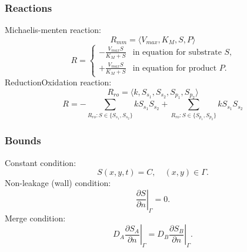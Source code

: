 \documentclass[a4paper,10pt]{article}
\begin{document}
\subsubsection{Reactions}

Michaelis-menten reaction:
\begin{equation}
    R_{mm} = \langle V_{max}, K_M, S, P \rangle
\end{equation}
\begin{equation}
    R = \begin{cases}
            -\frac{V_{max} S}{K_M + S} & \text{in equation for substrate $S$,}
            \\
            +\frac{V_{max} S}{K_M + S} & \text{in equation for product $P$.}
        \end{cases}
\end{equation}
%
ReductionOxidation reaction:
\begin{equation}
    R_{ro} = \langle k, S_{s_1}, S_{s_2}, S_{p_1}, S_{p_2} \rangle
\end{equation}
\begin{equation}
    R =
        - \sum_{R_{ro} : S \in \{S_{s_1}, S_{s_2}\}} k S_{s_1} S_{s_2}
        + \sum_{R_{ro} : S \in \{S_{p_1}, S_{p_2}\}} k S_{s_1} S_{s_2}
\end{equation}



\subsubsection{Bounds}
Constant condition:
\begin{equation}
    S(x, y, t) = C,\quad (x, y) \in \Gamma.
\end{equation}
Non-leakage (wall) condition:
\begin{equation}
    \left.\frac{\partial S}{\partial n}\right|_{\Gamma} = 0.
\end{equation}
Merge condition:
\begin{equation}
    D_A \left.\frac{\partial S_A}{\partial n}\right|_{\Gamma} =
    D_B \left.\frac{\partial S_B}{\partial n}\right|_{\Gamma}.
\end{equation}





\end{document}
